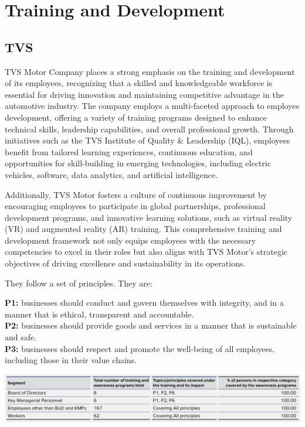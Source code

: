 \section{Training and Development}

\subsection{TVS}
TVS Motor Company places a strong emphasis on the training and development of its employees, recognizing that a skilled and knowledgeable workforce is essential for driving innovation and maintaining competitive advantage in the automotive industry. The company employs a multi-faceted approach to employee development, offering a variety of training programs designed to enhance technical skills, leadership capabilities, and overall professional growth. Through initiatives such as the TVS Institute of Quality \& Leadership (IQL), employees benefit from tailored learning experiences, continuous education, and opportunities for skill-building in emerging technologies, including electric vehicles, software, data analytics, and artificial intelligence.

Additionally, TVS Motor fosters a culture of continuous improvement by encouraging employees to participate in global partnerships, professional development programs, and innovative learning solutions, such as virtual reality (VR) and augmented reality (AR) training. This comprehensive training and development framework not only equips employees with the necessary competencies to excel in their roles but also aligns with TVS Motor's strategic objectives of driving excellence and sustainability in its operations.

They follow a set of principles\cite{tvsmotorMotorCompany}\cite{tvsmotorMotorCompanyMission}. They are:

\textbf{P1:} businesses should conduct and govern themselves with integrity, and in a manner that is ethical, transparent and accountable. \\\textbf{P2:} businesses should provide goods and services in a manner that is sustainable and safe. \\\textbf{P3:} businesses should respect and promote the well-being of all employees, including those in their value chains.

\includegraphics[width=\linewidth]{psycho_images/TVS_Training.png}

